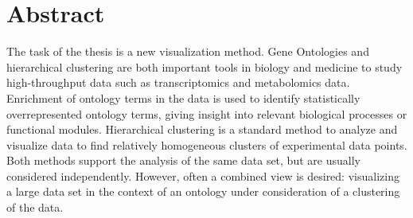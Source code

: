 \section*{Abstract}

The task of the thesis is a new visualization method. Gene Ontologies and hierarchical clustering are both important tools in biology and medicine to study high-throughput data such as transcriptomics and metabolomics data. Enrichment of ontology terms in the data is used to identify statistically overrepresented ontology terms, giving insight into relevant biological processes or functional modules. Hierarchical clustering is a standard method to analyze and visualize data to find relatively homogeneous clusters of experimental data points. Both methods support the analysis of the same data set, but are usually considered independently. However, often a combined view is desired: visualizing a large data set in the context of an ontology under consideration of a clustering of the data.